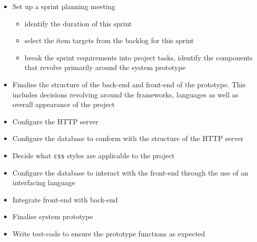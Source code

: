 \documentclass[10pt,twocolumn]{witseiepaper}
\begin{document}
	\begin{itemize}
		\item Set up a sprint planning meeting
		\begin{itemize}
			\item identify the duration of this sprint
			\item select the item targets from the backlog for this sprint
			\item break the sprint requirements into project tasks, identify the components that revolve primarily around the system prototype
		\end{itemize}
		\item Finalise the structure of the back-end and front-end of the prototype. This includes decisions revolving around the frameworks, languages as well as overall appearance of the project
		\item Configure the HTTP server
		\item Configure the database to conform with the structure of the HTTP server
		\item Decide what \texttt{css} styles are applicable to the project
		\item Configure the database to interact with the front-end through the use of an interfacing language
		\item Integrate front-end with back-end
		\item Finalise system prototype
		\item Write test-code to ensure the prototype functions as expected
		

\end{itemize}
\end{document}
